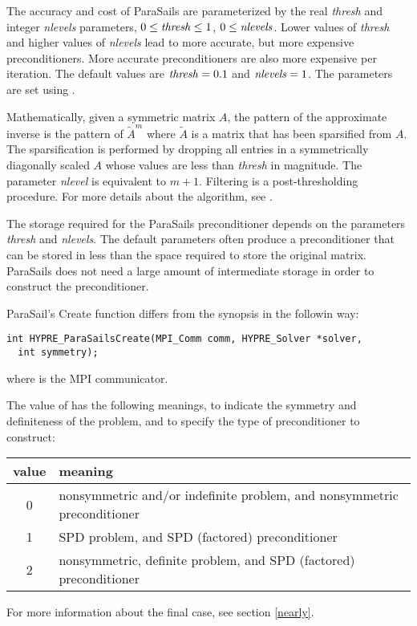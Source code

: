 The accuracy and cost of ParaSails are parameterized by the real {\em thresh}
and integer {\em nlevels} parameters,
$0 \le {\it thresh} \le 1$, $0 \le {\it nlevels}$.
Lower values of {\em thresh}
and higher values of {\em nlevels} lead to more accurate, but more expensive
preconditioners.  More accurate preconditioners are also more expensive
per iteration.  The default values are ${\it thresh} = 0.1$
and ${\it nlevels} = 1$.  The parameters are set using
.

Mathematically, given a symmetric matrix $A$, the pattern of the
approximate inverse is the pattern of $\tilde{A}^m$ where $\tilde{A}$
is a matrix that has been sparsified from $A$.  The sparsification
is performed by dropping all entries in a symmetrically diagonally scaled $A$
whose values are less than {\em thresh} in magnitude.  The parameter
{\em nlevel} is equivalent to $m+1$.
Filtering is a post-thresholding procedure.
For more details about the algorithm, see \cite{EChow_2000}.

The storage required for the ParaSails preconditioner depends on
the parameters {\em thresh} and {\em nlevels}.  The default parameters
often produce a preconditioner that can be stored in less than the
space required to store the original matrix.
ParaSails does not need a large amount of intermediate storage in
order to construct the preconditioner.


ParaSail's Create function differs from the synopsis in the followin way:

\begin{display}
\begin{verbatim}
int HYPRE_ParaSailsCreate(MPI_Comm comm, HYPRE_Solver *solver,
  int symmetry);
\end{verbatim}
\end{display}
where  is the MPI communicator.

The value of  has the following meanings, to indicate
the symmetry and definiteness of the problem, and to specify the 
type of preconditioner to construct:
\begin{center}
\begin{tabular}{|c|l|} \hline
value & meaning \\ \hline
0 & nonsymmetric and/or indefinite problem, and nonsymmetric preconditioner \\
1 & SPD problem, and SPD (factored) preconditioner \\
2 & nonsymmetric, definite problem, and SPD (factored) preconditioner \\ 
\hline
\end{tabular}
\end{center}
For more information about the final case, see section \ref{nearly}.

